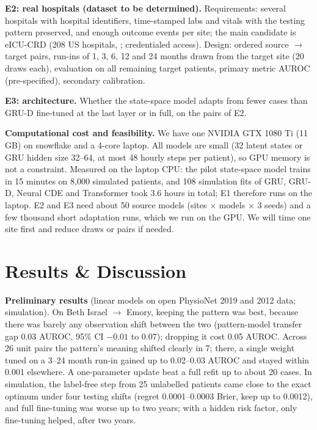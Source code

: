 \documentclass{article}
\theoremstyle{plain}
\theoremstyle{definition}
\theoremstyle{remark}
\begin{document}
\textbf{E2: real hospitals (dataset to be determined).} Requirements: several hospitals with hospital identifiers, time-stamped labs and vitals with the testing pattern preserved, and enough outcome events per site; the main candidate is eICU-CRD (208 US hospitals, \citealp{pollard2018}; credentialed access). Design: ordered source $\to$ target pairs, run-ins of 1, 3, 6, 12 and 24 months drawn from the target site (20 draws each), evaluation on all remaining target patients, primary metric AUROC (pre-specified), secondary calibration.

\textbf{E3: architecture.} Whether the state-space model adapts from fewer cases than GRU-D fine-tuned at the last layer or in full, on the pairs of E2.

\textbf{Computational cost and feasibility.} We have one NVIDIA GTX 1080 Ti (11\,GB) on snowflake and a 4-core laptop. All models are small (32 latent states or GRU hidden size 32--64, at most 48 hourly steps per patient), so GPU memory is not a constraint. Measured on the laptop CPU: the pilot state-space model trains in 15 minutes on 8{,}000 simulated patients, and 108 simulation fits of GRU, GRU-D, Neural CDE and Transformer took 3.6 hours in total; E1 therefore runs on the laptop. E2 and E3 need about 50 source models (sites $\times$ models $\times$ 3 seeds) and a few thousand short adaptation runs, which we run on the GPU. We will time one site first and reduce draws or pairs if needed.

\section{Results \& Discussion}

\textbf{Preliminary results} (linear models on open PhysioNet 2019 and 2012 data; simulation). On Beth Israel $\to$ Emory, keeping the pattern was best, because there was barely any observation shift between the two (pattern-model transfer gap 0.03 AUROC, 95\% CI $-0.01$ to $0.07$); dropping it cost 0.05 AUROC. Across 26 unit pairs the pattern's meaning shifted clearly in 7; there, a single weight tuned on a 3--24 month run-in gained up to 0.02--0.03 AUROC and stayed within 0.001 elsewhere. A one-parameter update beat a full refit up to about 20 cases. In simulation, the label-free step from 25 unlabelled patients came close to the exact optimum under four testing shifts (regret 0.0001--0.0003 Brier, keep up to 0.0012), and full fine-tuning was worse up to two years; with a hidden risk factor, only fine-tuning helped, after two years.
\end{document}
